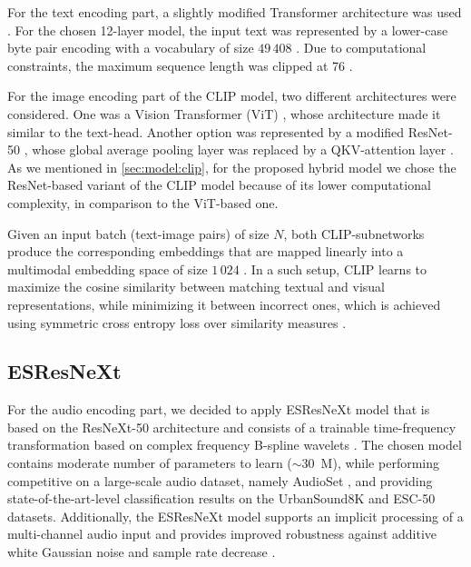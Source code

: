 \documentclass[runningheads]{llncs}
\begin{document}
For the text encoding part, a slightly modified \cite{radford2019transformer} Transformer \cite{vaswani2017attention} architecture was used \cite{radford2021clip}.
For the chosen 12-layer model, the input text was represented by a lower-case byte pair encoding with a vocabulary of size $49\,408$ \cite{radford2021clip}.
Due to computational constraints, the maximum sequence length was clipped at 76 \cite{radford2021clip}.

For the image encoding part of the \mbox{CLIP} model, two different architectures were considered.
One was a Vision Transformer (ViT) \cite{radford2021clip,dosovitskiy2020vit}, whose architecture made it similar to the text-head.
Another option was represented by a modified \mbox{ResNet-50} \cite{he2016resnet}, whose global average pooling layer was replaced by a QKV-attention layer \cite{radford2021clip}.
As we mentioned in \autoref{sec:model:clip}, for the proposed hybrid model we chose the ResNet-based variant of the CLIP model because of its lower computational complexity, in comparison to the ViT-based one.

Given an input batch (text-image pairs) of size $N$, both CLIP-subnetworks produce the corresponding embeddings that are mapped linearly into a multimodal embedding space of size $1\,024$ \cite{radford2021clip}.
In a such setup, CLIP learns to maximize the cosine similarity between matching textual and visual representations, while minimizing it between incorrect ones, which is achieved using symmetric cross entropy loss over similarity measures \cite{radford2021clip}.

\subsection{ESResNeXt} \label{sec:model:esrnx}
For the audio encoding part, we decided to apply \mbox{ESResNeXt} model \cite{guzhov2021esrnx} that is based on the \mbox{ResNeXt-50} \cite{chollet2017resnext} architecture and consists of a trainable time-frequency transformation based on complex frequency B-spline wavelets \cite{teolis1998fbsp}.
The chosen model contains moderate number of parameters to learn (\mbox{$\sim 30$ M}), while performing competitive on a large-scale audio dataset, namely \mbox{AudioSet} \cite{gemmeke2017audioset}, and providing state-of-the-art-level classification results on the \mbox{UrbanSound8K} \cite{salamon2014us8k} and \mbox{ESC-50} \cite{piczak2015esc} datasets.
Additionally, the ESResNeXt model supports an implicit processing of a multi-channel audio input and provides improved robustness against additive white Gaussian noise and sample rate decrease \cite{guzhov2021esrnx}.
\end{document}
